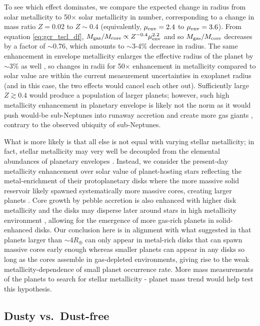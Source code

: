 \documentclass[twocolumn]{aastex631}
\begin{document}
To see which effect dominates, we compare the expected change in radius from solar metallicity to 50$\times$ solar metallicity in number, corresponding to a change in mass ratio $Z=0.02$ to $Z \sim 0.4$ (equivalently, $\mu_{\rm env}=2.4$ to $\mu_{\rm env}=3.6$). From equation \ref{eq:gcr_tscl_df}, $M_{\rm gas}/M_{\rm core} \propto Z^{-0.4}\mu_{\rm env}^{2.2}$ and so $M_{\rm gas}/M_{\rm core}$ decreases by a factor of $\sim$0.76, which amounts to $\sim$3-4\% decrease in radius. The same enhancement in envelope metallicity enlarges the effective radius of the planet by $\sim$3\% as well \citep{Lopez14}, so changes in radii for 50$\times$ enhancement in metallicity compared to solar value are within the current measurement uncertainties in exoplanet radius (and in this case, the two effects would cancel each other out). Sufficiently large $Z \gtrsim 0.4$ would produce a population of larger planets; however, such high metallicity enhancement in planetary envelope is likely not the norm as it would push would-be sub-Neptunes into runaway accretion and create more gas giants \citep{Lee16}, contrary to the observed ubiquity of sub-Neptunes.

What is more likely is that all else is not equal with varying stellar metallicity; in fact, stellar metallicity may very well be decoupled from the elemental abundances of planetary envelopes \citep[see, e.g.,][for observational hints]{Petigura22}. Instead, we consider the present-day metallicity enhancement over solar value of planet-hosting stars reflecting the metal-enrichment of their protoplanetary disks where the more massive solid reservoir likely spawned systematically more massive cores, creating larger planets \citep[e.g.,][]{Dawson15}. Core growth by pebble accretion is also enhanced with higher disk metallicity \citep[e.g.,][]{Lambrechts14,Lin18} and the disks may disperse later around stars in high metallicity environment \citep[e.g.,][]{Yasui09}, allowing for the emergence of more gas-rich planets in solid-enhanced disks. Our conclusion here is in alignment with what \citet{Lee19} suggested in that planets larger than $\sim$4$R_\oplus$ can only appear in metal-rich disks that can spawn massive cores early enough whereas smaller planets can appear in any disks so long as the cores assemble in gas-depleted environments, giving rise to the weak metallicity-dependence of small planet occurrence rate. More mass measurements of the planets to search for stellar metallicity - planet mass trend would help test this hypothesis.

\subsection{Dusty vs.~Dust-free}
\label{ssec:dusty_v_df}
\end{document}
